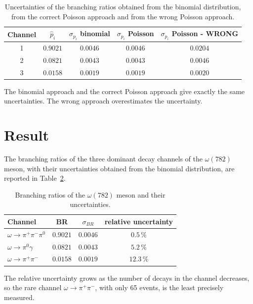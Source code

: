 \documentclass[11pt,a4paper]{article}
\begin{document}
	\begin{table}[!h]
		\centering
		\begin{tabular}{c c c c c}
			\hline
			Channel & $\hat{p}_i$ & $\sigma_{p_i}$ binomial & $\sigma_{p_i}$ Poisson & $\sigma_{p_i}$ Poisson - {\color{red}WRONG} \\
			\hline
			1 & $0.9021$ & $0.0046$ & $0.0046$ & $0.0204$ \\
			2 & $0.0821$ & $0.0043$ & $0.0043$ & $0.0046$ \\
			3 & $0.0158$ & $0.0019$ & $0.0019$ & $0.0020$ \\
			\hline
		\end{tabular}
		\caption{Uncertainties of the branching ratios obtained from the binomial distribution, from the correct Poisson approach and from the wrong Poisson approach.}
		\label{tab:comparison}
	\end{table}
	\FloatBarrier
	
	The binomial approach and the correct Poisson approach give exactly the same uncertainties.
	The wrong approach overestimates the uncertainty.
	\section*{Result}
	
	The branching ratios of the three dominant decay channels of the $\omega(782)$ meson, with their uncertainties obtained from the binomial distribution, are reported in Table~\ref{tab:result}.
	
	\begin{table}[!h]
		\centering
		\begin{tabular}{l c c c}
			\hline
			Channel & BR & $\sigma_{BR}$ & relative uncertainty \\
			\hline
			$\omega \to \pi^+\pi^-\pi^0$ & $0.9021$ & $0.0046$ & $0.5\,\%$ \\
			$\omega \to \pi^0\gamma$     & $0.0821$ & $0.0043$ & $5.2\,\%$ \\
			$\omega \to \pi^+\pi^-$      & $0.0158$ & $0.0019$ & $12.3\,\%$ \\
			\hline
		\end{tabular}
		\caption{Branching ratios of the $\omega(782)$ meson and their uncertainties.}
		\label{tab:result}
	\end{table}
	\FloatBarrier
	
	The relative uncertainty grows as the number of decays in the channel decreases, so the rare channel $\omega \to \pi^+\pi^-$, with only 65 events, is the least precisely measured.
	
\end{document}
